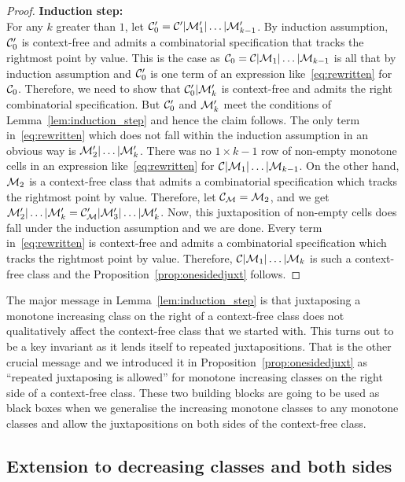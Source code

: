 \documentclass[12pt, a4paper, twoside]{report}
\begin{document}
\begin{proof}
\noindent \textbf{Induction step:}\\
\noindent For any $k$ greater than $1$, let $\mathcal{C}_0' = \mathcal{C}'|\mathcal{M}'_1|\ldots|\mathcal{M}'_{k-1}$. By induction assumption, $\mathcal{C}_0'$ is context-free and admits a combinatorial specification that tracks the rightmost point by value. This is the case as $\mathcal{C}_0 = \mathcal{C}|\mathcal{M}_1|\ldots|\mathcal{M}_{k-1}$ is all that by induction assumption and $\mathcal{C}_0'$ is one term of an expression like~\eqref{eq:rewritten} for $\mathcal{C}_0$. Therefore, we need to show that $\mathcal{C}_0'|\mathcal{M}_k'$ is context-free and admits the right combinatorial specification. But $\mathcal{C}_0'$ and $\mathcal{M}_k'$ meet the conditions of Lemma~\ref{lem:induction_step} and hence the claim follows. The only term in~\eqref{eq:rewritten} which does not fall within the induction assumption in an obvious way is $\mathcal{M}_2'|\ldots|\mathcal{M}_k'$. There was no $1\times k-1$ row of non-empty monotone cells in an expression like~\eqref{eq:rewritten} for $\mathcal{C}|\mathcal{M}_1|\ldots|\mathcal{M}_{k-1}$. On the other hand, $\mathcal{M}_2$ is a context-free class that admits a combinatorial specification which tracks the rightmost point by value. Therefore, let $\mathcal{C}_{\mathcal{M}} = \mathcal{M}_2$, and we get $\mathcal{M}_2'|\ldots|\mathcal{M}_k' = \mathcal{C}_{\mathcal{M}}'|\mathcal{M}_3'|\ldots|\mathcal{M}_k'$. Now, this juxtaposition of non-empty cells does fall under the induction assumption and we are done. Every term in~\eqref{eq:rewritten} is context-free and admits a combinatorial specification which tracks the rightmost point by value. Therefore, $\mathcal{C}|\mathcal{M}_1|\ldots|\mathcal{M}_k$ is such a context-free class and the Proposition~\ref{prop:onesidedjuxt} follows.
\end{proof}

The major message in Lemma~\ref{lem:induction_step} is that juxtaposing a monotone increasing class on the right of a context-free class does not qualitatively affect the context-free class that we started with. This turns out to be a key invariant as it lends itself to repeated juxtapositions. That is the other crucial message and we introduced it in Proposition~\ref{prop:onesidedjuxt} as ``repeated juxtaposing is allowed'' for monotone increasing classes on the right side of a context-free class. These two building blocks are going to be used as black boxes when we generalise the increasing monotone classes to any monotone classes and allow the juxtapositions on both sides of the context-free class. 


\subsection{Extension to decreasing classes and both sides}
\label{sec:extensions}
\end{document}
